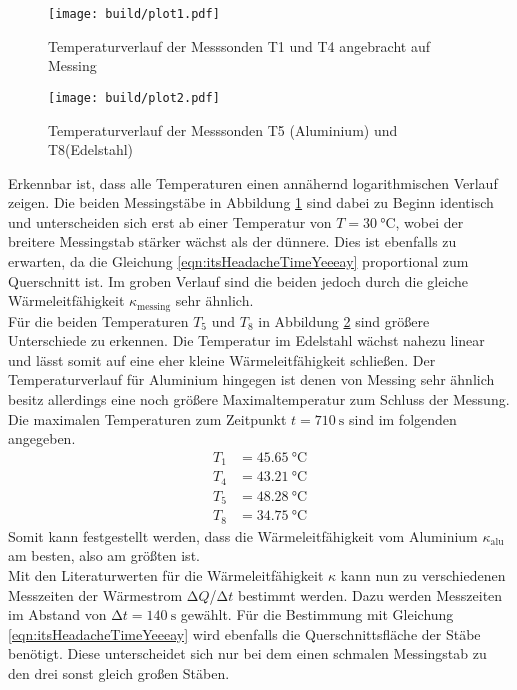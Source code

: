 \begin{figure}
    \centering
    \texttt{[image: build/plot1.pdf]}
    \caption{Temperaturverlauf der Messsonden T1 und T4 angebracht auf Messing} 
    \label{fig:plot1}
\end{figure}

\begin{figure}
    \centering
    \texttt{[image: build/plot2.pdf]}
    \caption{Temperaturverlauf der Messsonden T5 (Aluminium) und T8(Edelstahl)} 
    \label{fig:plot2}
\end{figure}
\newpage
Erkennbar ist, dass alle Temperaturen einen annähernd logarithmischen Verlauf zeigen. 
Die beiden Messingstäbe in Abbildung \ref{fig:plot1} sind dabei zu Beginn identisch und unterscheiden sich erst ab einer Temperatur von $T = \SI{30}{\celsius}$, wobei der breitere Messingstab stärker wächst als der dünnere. Dies ist ebenfalls zu erwarten, da die Gleichung
\ref{eqn:itsHeadacheTimeYeeeay} proportional zum Querschnitt ist. Im groben Verlauf sind die beiden jedoch durch die gleiche Wärmeleitfähigkeit $\kappa_{\text{messing}}$ sehr ähnlich.
\\
Für die beiden Temperaturen $T_{5}$ und $T_{8}$ in Abbildung \ref{fig:plot2} sind größere Unterschiede zu erkennen. Die Temperatur im Edelstahl wächst nahezu linear und lässt somit auf eine eher kleine Wärmeleitfähigkeit schließen. Der 
Temperaturverlauf für Aluminium hingegen ist denen von Messing sehr ähnlich besitz allerdings eine noch größere Maximaltemperatur zum Schluss der Messung. 
\\
Die maximalen Temperaturen zum Zeitpunkt $t = \SI{710}{\second}$ sind im folgenden angegeben.
\begin{align}
    T_1 &= \SI{45.65}{\celsius} \\
    T_4 &= \SI{43.21}{\celsius} \\
    T_5 &= \SI{48.28}{\celsius} \\
    T_8 &= \SI{34.75}{\celsius}
\end{align}
Somit kann festgestellt werden, dass die Wärmeleitfähigkeit vom Aluminium $\kappa_{\text{alu}}$ am besten, also am größten ist.
\\
\newline
Mit den Literaturwerten für die Wärmeleitfähigkeit $\kappa$ kann nun zu verschiedenen Messzeiten der Wärmestrom $\increment Q$/$\increment t$ bestimmt werden. Dazu werden Messzeiten im Abstand von $\increment t = \SI{140}{\second}$
gewählt. Für die Bestimmung mit Gleichung \ref{eqn:itsHeadacheTimeYeeeay} wird ebenfalls die Querschnittsfläche der Stäbe benötigt. Diese unterscheidet sich nur bei dem einen schmalen Messingstab zu den drei sonst gleich großen Stäben.
